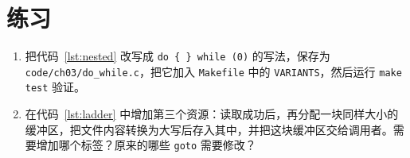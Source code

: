 \section*{练习}

\begin{enumerate}
  \item 把代码~\ref{lst:nested} 改写成 \texttt{do \{ \} while (0)} 的写法，保存为 \texttt{code/ch03/do\_while.c}，把它加入 \texttt{Makefile} 中的 \texttt{VARIANTS}，然后运行 \texttt{make test} 验证。
  \item 在代码~\ref{lst:ladder} 中增加第三个资源：读取成功后，再分配一块同样大小的缓冲区，把文件内容转换为大写后存入其中，并把这块缓冲区交给调用者。需要增加哪个标签？原来的哪些 \texttt{goto} 需要修改？
\end{enumerate}
